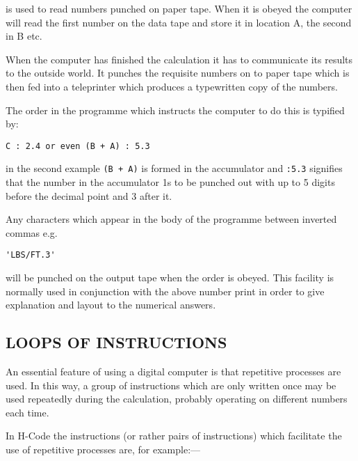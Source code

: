 \documentclass[10pt, a4paper, oneside]{article}
\newcommand{\mytt}[1]{\texttt{\footnotesize #1}}
\begin{document}
\begin{multicols}{2}
is used to read numbers punched on paper tape.  When
it is obeyed the computer will read the first number
on the data tape and store it in location A, the second
in B etc.

When the computer has finished the calculation
it has to communicate its results to the outside world.
It punches the requisite numbers on to paper tape which
is then fed into a teleprinter which produces a
typewritten copy of the numbers.

The order in the programme which instructs
the computer to do this is typified by:

\begin{addmargin}[1cm]{1em}%
\begin{lstlisting}
C : 2.4 or even (B + A) : 5.3
\end{lstlisting}
\end{addmargin}

in the second example \mytt{(B + A)} is formed in
the accumulator and \mytt{:5.3} signifies that the number in
the accumulator 1s to be punched out with up to 5
digits before the decimal point and 3 after it.

Any characters which appear in the body of
the programme between inverted commas e.g.

\begin{addmargin}[1cm]{1em}%
\begin{lstlisting}
'LBS/FT.3'
\end{lstlisting}
\end{addmargin}

will be punched on the output tape when the order is
obeyed.  This facility is normally used in conjunction
with the above number print in order to give
explanation and layout to the numerical answers.

\subsection{LOOPS OF INSTRUCTIONS}

An essential feature of using a digital
computer is that repetitive processes are used.  In
this way, a group of instructions which are only
written once may be used repeatedly during the
calculation, probably operating on different numbers
each time.

In H-Code the instructions (or rather pairs
of instructions) which facilitate the use of repetitive
processes are, for example:—

\renewcommand{\labelenumi}{(\roman{enumi})}
\begin{enumerate}
\def\theenumi{\roman{enumi}}


\end{enumerate}
\end{multicols}
\end{document}
